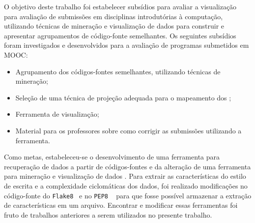 %	
	
	O objetivo deste trabalho foi estabelecer subsídios para avaliar a visualização para
	avaliação de submissões em disciplinas introdutórias à computação, utilizando técnicas
	de mineração e visualização de dados para construir e apresentar agrupamentos de
	código-fonte semelhantes. Os seguintes subsídios foram investigados e desenvolvidos
	para a avaliação de programas submetidos em \acs{MOOC}:
	\begin{itemize}
		\item Agrupamento dos códigos-fontes semelhantes, utilizando técnicas de mineração;
		\item Seleção de uma técnica de projeção adequada para o mapeamento dos ;
		\item Ferramenta de visualização;
		\item Material para os professores sobre como corrigir as submissões utilizando a ferramenta.
	\end{itemize}
	
	Como metas, estabeleceu-se o desenvolvimento de uma ferramenta para recuperação
	de dados a partir de códigos-fontes e da alteração de uma ferramenta para mineração
	e visualização de dados \cite{Alencar-etal:2012}. Para extrair as características
	do estilo de escrita e a complexidade ciclomáticas dos dados, foi realizado
	modificações no código-fonte do \texttt{Flake8}~\cite{flake8} e no \texttt{PEP8}
	~\cite{pep8} para que fosse possível armazenar a extração de características em
	um arquivo. Encontrar e modificar essas	ferramentas foi fruto de trabalhos anteriores
	a serem utilizados no presente trabalho.
	
